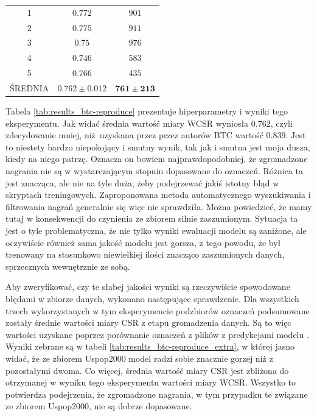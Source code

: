\begin{table}
{\begin{tabular}{ccc}
        1                 & $0.772$    & $901$    \\
        2                 & $0.775$    & $911$    \\
        3                 & $0.75$    & $976$    \\
        4                 & $0.746$    & $583$    \\
        5                 & $0.766$    & $435$    \\ \hline
        ŚREDNIA           & $\mathbf{0.762 \pm 0.012}$ & $\mathbf{761 \pm 213}$ \\ \hline
    \end{tabular}
    }
\end{table}

Tabela \ref{tab:results_btc-reproduce} prezentuje hiperparametry i wyniki tego eksperymentu. Jak widać średnia wartość miary WCSR wyniosła $0.762$, czyli zdecydowanie mniej, niż uzyskana przez przez autorów BTC wartość $0.839$. Jest to niestety bardzo niepokojący i smutny wynik, tak jak i smutna jest moja dusza, kiedy na niego patrzę. Oznacza on bowiem najprawdopodobniej, że zgromadzone nagrania nie są w wystarczającym stopniu dopasowane do oznaczeń. Różnica ta jest znacząca, ale nie na tyle duża, żeby podejrzewać jakiś istotny błąd w skryptach treningowych. Zaproponowana metoda automatycznego wyszukiwania i filtrowania nagrań generalnie się więc nie sprawdziła. Można powiedzieć, że mamy tutaj w konsekwencji do czynienia ze zbiorem silnie zaszumionym. Sytuacja ta jest o tyle problematyczna, że nie tylko wyniki ewaluacji modelu są zaniżone, ale oczywiście również sama jakość modelu jest gorsza, z tego powodu, że był trenowany na stosunkowo niewielkiej ilości znacząco zaszumionych danych, sprzecznych wewnętrznie ze sobą.

Aby zweryfikować, czy te słabej jakości wyniki są rzeczywiście spowodowane błędami w zbiorze danych, wykonano następujące sprawdzenie. Dla wszystkich trzech wykorzystanych w tym eksperymencie podzbiorów oznaczeń podsumowane zostały średnie wartości miary CSR z etapu gromadzenia danych. Są to więc wartości uzyskane poprzez porównanie oznaczeń z plików  z predykcjami modelu \cite{korzeniowski_feature_2016}. Wyniki zebrane są w tabeli \ref{tab:results_btc-reproduce_extra}, w której jasno widać, że ze zbiorem Uspop2000 model radzi sobie znacznie gorzej niż z pozostałymi dwoma. Co więcej, średnia wartość miary CSR jest zbliżona do otrzymanej w wyniku tego eksperymentu wartości miary WCSR. Wszystko to potwierdza podejrzenia, że zgromadzone nagrania, w tym przypadku te związane ze zbiorem Uspop2000, nie są dobrze dopasowane.

